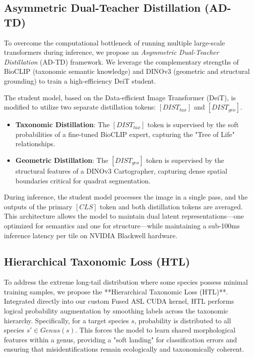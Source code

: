 \documentclass[10pt,twocolumn,letterpaper]{article}
\begin{document}
\subsection{Asymmetric Dual-Teacher Distillation (AD-TD)}
To overcome the computational bottleneck of running multiple large-scale transformers during inference, we propose an \textit{Asymmetric Dual-Teacher Distillation} (AD-TD) framework. We leverage the complementary strengths of BioCLIP (taxonomic semantic knowledge) and DINOv3 (geometric and structural grounding) to train a high-efficiency DeiT student.

The student model, based on the Data-efficient Image Transformer (DeiT), is modified to utilize two separate distillation tokens: $[DIST_{tax}]$ and $[DIST_{geo}]$.
\begin{itemize}
    \item \textbf{Taxonomic Distillation}: The $[DIST_{tax}]$ token is supervised by the soft probabilities of a fine-tuned BioCLIP expert, capturing the "Tree of Life" relationships.
    \item \textbf{Geometric Distillation}: The $[DIST_{geo}]$ token is supervised by the structural features of a DINOv3 Cartographer, capturing dense spatial boundaries critical for quadrat segmentation.
\end{itemize}

During inference, the student model processes the image in a single pass, and the outputs of the primary $[CLS]$ token and both distillation tokens are averaged. This architecture allows the model to maintain dual latent representations—one optimized for semantics and one for structure—while maintaining a sub-100ms inference latency per tile on NVIDIA Blackwell hardware.

\subsection{Hierarchical Taxonomic Loss (HTL)}
To address the extreme long-tail distribution where some species possess minimal training samples, we propose the **Hierarchical Taxonomic Loss (HTL)**. Integrated directly into our custom Fused ASL CUDA kernel, HTL performs logical probability augmentation by smoothing labels across the taxonomic hierarchy. Specifically, for a target species $s$, probability is distributed to all species $s' \in Genus(s)$. This forces the model to learn shared morphological features within a genus, providing a "soft landing" for classification errors and ensuring that misidentifications remain ecologically and taxonomically coherent.
\end{document}
